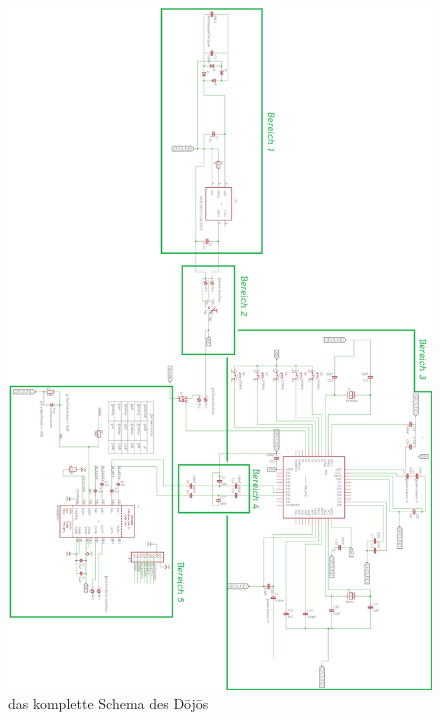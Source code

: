 \begin{figure}[H]
	\begin{center}
		\includegraphics[height=\textheight]{data/dojo-schema.png}
		\caption[das komplette Schema des Dōjōs]{das komplette Schema des Dōjōs} %
		\label{fig:dojo-schema}
	\end{center}
\end{figure}

 
